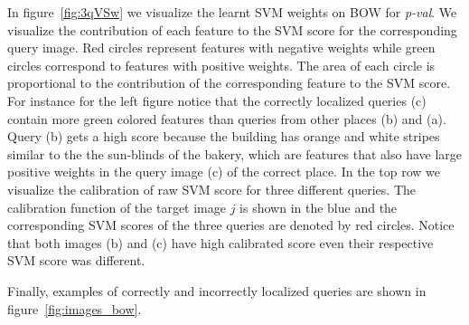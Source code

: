     In figure~\ref{fig:3qVSw} we visualize the learnt SVM weights on BOW for \emph{p-val}. We visualize the contribution of each feature to the SVM score for the corresponding query image. Red circles represent features with negative weights while green circles correspond to features with positive weights. The area of each circle is proportional to the contribution of the corresponding feature to the SVM score. For instance for the left figure notice that the correctly localized queries (c) contain more green colored features than queries from other places (b) and (a). Query (b) gets a high score because the building has orange and white stripes similar to the the sun-blinds of the bakery, which are features that also have large positive weights in the query image (c) of the correct place.
    In the top row we visualize the calibration of raw SVM score for three different queries. The calibration function of the target image $j$ is shown in the blue and the corresponding SVM scores of the three queries are denoted by red circles. Notice that both images (b) and (c) have high calibrated score even their respective SVM score was different.     
    
    Finally, examples of correctly and incorrectly localized queries are shown in figure~\ref{fig:images_bow}. 

